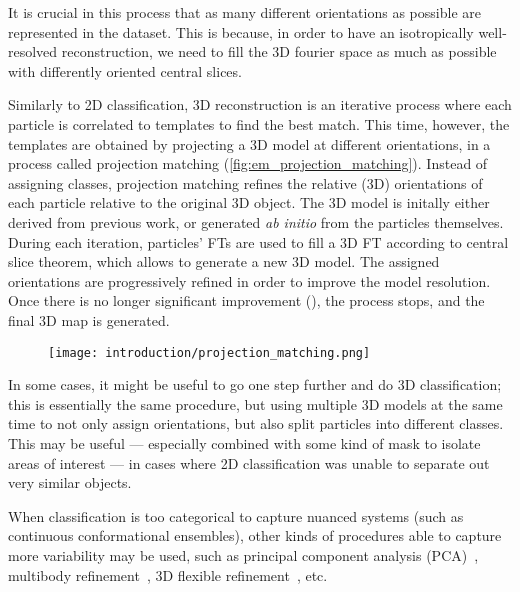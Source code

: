 It is crucial in this process that as many different orientations as possible are represented in the dataset.
This is because, in order to have an isotropically well-resolved reconstruction, we need to fill the 3D fourier space as much as possible with differently oriented central slices.

Similarly to 2D classification, 3D reconstruction is an iterative process where each particle is correlated to templates to find the best match.
This time, however, the templates are obtained by projecting a 3D model at different orientations, in a process called projection matching (\autoref{fig:em_projection_matching}).
Instead of assigning classes, projection matching refines the relative (3D) orientations of each particle relative to the original 3D object.
The 3D model is initally either derived from previous work, or generated \textit{ab initio} from the particles themselves.
During each iteration, particles' FTs are used to fill a 3D FT according to central slice theorem, which allows to generate a new 3D model.
The assigned orientations are progressively refined in order to improve the model resolution.
Once there is no longer significant improvement (), the process stops, and the final 3D map is generated.

\begin{figure}[ht]
    \centering
    \texttt{[image: introduction/projection\_matching.png]}
    \label{fig:em_projection_matching}
\end{figure}

In some cases, it might be useful to go one step further and do 3D classification; this is essentially the same procedure, but using multiple 3D models at the same time to not only assign orientations, but also split particles into different classes.
This may be useful --- especially combined with some kind of mask to isolate areas of interest --- in cases where 2D classification was unable to separate out very similar objects.

When classification is too categorical to capture nuanced systems (such as continuous conformational ensembles), other kinds of procedures able to capture more variability may be used, such as principal component analysis (PCA)~\cite{castano-diezDynamoFlexibleUserfriendly2012,punjani3DVariabilityAnalysis2021}, multibody refinement~\cite{nakaneMultibodyRefinementCryoEM2021}, 3D flexible refinement~\cite{punjani3DFlexibleRefinement2022}, etc.

